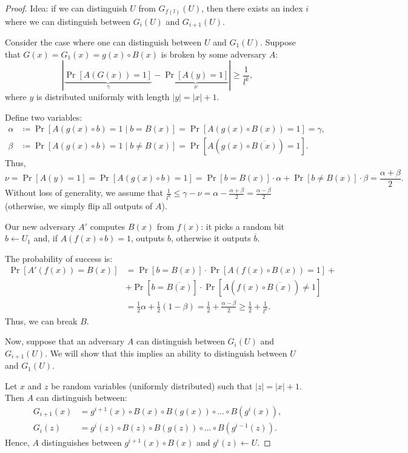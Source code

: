 \begin{proof}
  Idea: if we can distinguish $U$ from $G_{f(l)}(U)$, then there exists an index $i$ where we can distinguish between $G_i(U)$ and $G_{i + 1}(U)$.

  Consider the case where one can distinguish between $U$ and $G_{1}(U)$.
  Suppose that $G(x) = G_1(x) = g(x) \circ B(x)$ is broken by some adversary $A$:
   \[
	   \left| \underbrace{\Pr[A(G(x)) = 1]}_{\gamma} - \underbrace{\Pr[A(y) = 1]}_{\nu} \right| \ge \frac{1}{l^{k}}
  ,\] 
  where $y$ is distributed uniformly with length $|y| = |x| + 1$.
  
  Define two variables:
   \begin{align*}
	   \alpha &\coloneqq \Pr[A(g(x) \circ b) = 1  \mid b = B(x)] = \Pr[A(g(x) \circ B(x)) = 1] = \gamma,\\
	   \beta &\coloneqq \Pr[A(g(x) \circ b) = 1  \mid b \neq  B(x)] = \Pr[A(g(x) \circ \overline{B(x)}) = 1].
   \end{align*}
  Thus,
  \[
	  \nu = \Pr[A(y) = 1] = \Pr[A(g(x) \circ b) = 1] = \Pr[b = B(x)] \cdot \alpha + \Pr[b \neq B(x)] \cdot \beta = \frac{\alpha + \beta}{2}.
  \] 
  Without loss of generality, we assume that $\frac{1}{l^{k}} \le \gamma - \nu = \alpha - \frac{\alpha + \beta}{2} = \frac{\alpha - \beta}{2}$ (otherwise, we simply flip all outputs of $A$).
  
  Our new adversary $A'$ computes $B(x)$ from $f(x)$: it picks a random bit $b \gets U_1$ and, if $A(f(x) \circ b) = 1$, outputs $b$, otherwise it outputs $\overline{b}$.
  
  The probability of success is:
  \begin{align*}
	  \Pr[A'(f(x)) = B(x)] &= \Pr[b = B(x)] \cdot \Pr[A(f(x) \circ B(x)) = 1] + \\
						   &+ \Pr[b = \overline{B(x)}] \cdot \Pr[A(f(x) \circ \overline{B(x)}) \neq 1] \\
						   &= \frac{1}{2} \alpha + \frac{1}{2} (1 - \beta) = \frac{1}{2} + \frac{\alpha - \beta}{2} \ge  \frac{1}{2} + \frac{1}{l^{k}}.
  \end{align*}
  Thus, we can break $B$.

  Now, suppose that an adversary $A$ can distinguish between $G_i(U)$ and $G_{i + 1}(U)$. 
  We will show that this implies an ability to distinguish between $U$ and $G_1(U)$.
  
  Let $x$ and $z$ be random variables (uniformly distributed) such that $|z| = |x| + 1$.
  Then $A$ can distinguish between:
   \begin{align*}
	   G_{i + 1}(x) &= g^{i + 1}(x) \circ B(x) \circ B(g(x)) \circ \dots \circ B(g^{i}(x)),\\
	   G_{i}(z) &= g^{i}(z) \circ B(z) \circ B(g(z)) \circ \dots \circ B(g^{i - 1}(z)).
   \end{align*}
  Hence, $A$ distinguishes between $g^{i + 1}(x) \circ B(x)$ and $g^{i}(z) \gets U$.
\end{proof}
